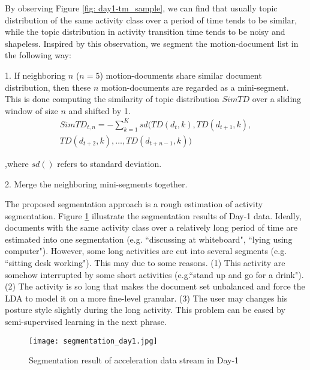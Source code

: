 \documentclass{sigchi}
\begin{document}
     By observing Figure \ref{fig: day1-tm_sample}, we can find that usually topic distribution of the same activity class over a period of time tends to be similar, while the topic distribution in activity transition time tends to be noisy and shapeless.
     Inspired by this observation, we segment the motion-document list in the following way:

    1. If neighboring $n$ ($n=5$) motion-documents share similar document distribution, then these $n$ motion-documents are regarded as a mini-segment.
    This is done computing the similarity of topic distribution $SimTD$ over a sliding window of size $n$ and shifted by 1.
        \begin{equation}
            \begin{split}
             SimTD_{t,n} = -\sum_{k=1}^K sd(TD(d_t, k), TD(d_{t+1}, k),  \\ TD(d_{t+2}, k), \ldots,
              TD(d_{t+n-1}, k))
            \end{split}
        \end{equation}

        ,where $sd()$ refers to standard deviation.

    2. Merge the neighboring mini-segments together.

    The proposed segmentation approach is a rough estimation of activity segmentation.
    Figure \ref{fig: day1-segmentation-result} illustrate the segmentation results of Day-1 data.
    Ideally, documents with the same activity class over a relatively long period of time are estimated into one segmentation (e.g. ``discussing at whiteboard", ``lying using computer").
    However, some long activities are cut into several segments (e.g. ``sitting desk working").
    This may due to some reasons.
    (1) This activity are somehow interrupted by some short activities (e.g.``stand up and go for a drink"). (2) The activity is so long that makes the document set unbalanced and force the LDA to model it on a more fine-level granular.
    (3) The user may changes his posture style slightly during the long activity.
    This problem can be eased by semi-supervised learning in the next phrase.

    \begin{figure}
        \centering
        \texttt{[image: segmentation\_day1.jpg]}
        \caption{Segmentation result of acceleration data stream in Day-1}
        \label{fig: day1-segmentation-result}
    \end{figure}
\end{document}
